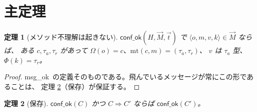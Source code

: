 \documentclass[11pt,a4paper]{ltjsarticle}
\newtheorem{theorem}{定理}
\theoremstyle{definition}
\theoremstyle{remark}
\newcommand{\Om}{\Omega}
\newcommand{\Ph}{\Phi}
\newcommand{\mtab}{\mathrm{mt}}
\newcommand{\msgok}{\textsf{msg\_ok}}
\newcommand{\confok}{\textsf{conf\_ok}}
\newcommand{\cstep}{\Longrightarrow}
\begin{document}
\section{主定理}

\begin{theorem}[メソッド不理解は起きない]\label{th:nmnu}
$\confok(H,\vec{M},\vec{t})$ で $\langle o,m,v,k\rangle \in \vec{M}$ ならば、
ある $c,\tau_a,\tau_r$ があって $\Om(o) = c$、$\mtab(c,m) = (\tau_a,\tau_r)$、
$v$ は $\tau_a$ 型、$\Ph(k) = \tau_r$。
\end{theorem}

\begin{proof}
\msgok\ の定義そのものである。飛んでいるメッセージが常にこの形であることは、
定理 \ref{th:pres}（保存）が保証する。
\end{proof}

\begin{theorem}[保存]\label{th:pres}
$\confok(C)$ かつ $C \cstep C'$ ならば $\confok(C')$。
\end{theorem}
\end{document}
